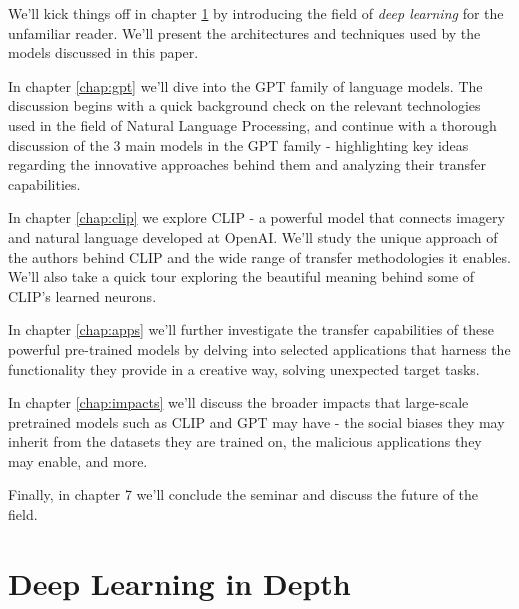 \documentclass{article}
\begin{document}
\medskip
\noindent
We'll kick things off in chapter \ref{chap:dl} by introducing the field of \emph{deep learning} for the unfamiliar reader. We'll present the architectures and techniques used by the models discussed in this paper. 

\medskip
\noindent
In chapter \ref{chap:gpt} we'll dive into the GPT family of language models. The discussion begins with a quick background check on the relevant technologies used in the field of Natural Language Processing, and continue with a thorough discussion of the 3 main models in the GPT family - highlighting key ideas regarding the innovative approaches behind them and analyzing their transfer capabilities.

\medskip
\noindent
In chapter \ref{chap:clip} we explore CLIP - a powerful model that connects imagery and natural language developed at OpenAI. We'll study the unique approach of the authors behind CLIP and the wide range of transfer methodologies it enables. We'll also take a quick tour exploring the beautiful meaning behind some of CLIP's learned neurons.

\medskip
\noindent
In chapter \ref{chap:apps} we'll further investigate the transfer capabilities of these powerful pre-trained models by delving into selected applications that harness the functionality they provide in a creative way, solving unexpected target tasks.

\medskip
\noindent
In chapter \ref{chap:impacts} we'll discuss the broader impacts that large-scale pretrained models such as CLIP and GPT may have - the social biases they may inherit from the datasets they are trained on, the malicious applications they may enable, and more.

\medskip
\noindent
Finally, in chapter 7 we'll conclude the seminar and discuss the future of the field.




\newpage
\section{Deep Learning in Depth}
\label{chap:dl}


\end{document}

